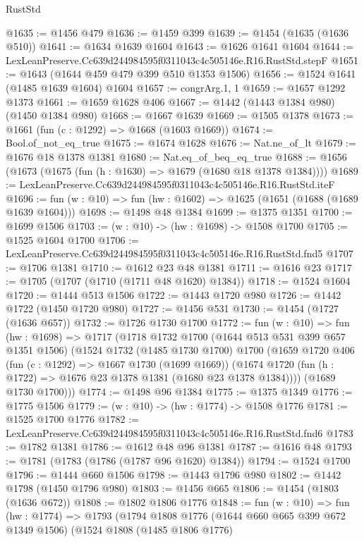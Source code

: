 \begin{lexlean}{RustStd}
\begin{coremodule}
@1635 := @1456 @479
@1636 := @1459 @399
@1639 := @1454 (@1635 (@1636 @510))
@1641 := @1634 @1639 @1604
@1643 := @1626 @1641 @1604
@1644 := LexLeanPreserve.Cc639d244984595f0311043c4c505146e.R16.RustStd.stepF
@1651 := @1643 (@1644 @459 @479 @399 @510 @1353 @1506)
@1656 := @1524 @1641 (@1485 @1639 @1604) @1604
@1657 := congrArg.{1, 1}
@1659 := @1657 @1292 @1373
@1661 := @1659 @1628 @406
@1667 := @1442 (@1443 @1384 @980) (@1450 @1384 @980)
@1668 := @1667 @1639
@1669 := @1505 @1378
@1673 := @1661 (fun (c : @1292) => @1668 (@1603 @1669))
@1674 := Bool.of_not_eq_true
@1675 := @1674 @1628
@1676 := Nat.ne_of_lt
@1679 := @1676 @18 @1378 @1381
@1680 := Nat.eq_of_beq_eq_true
@1688 := @1656 (@1673 (@1675 (fun (h : @1630) => @1679 (@1680 @18 @1378 @1384))))
@1689 := LexLeanPreserve.Cc639d244984595f0311043c4c505146e.R16.RustStd.iteF
@1696 := fun (w : @10) => fun (hw : @1602) => @1625 (@1651 (@1688 (@1689 @1639 @1604)))
@1698 := @1498 @48 @1384
@1699 := @1375 @1351
@1700 := @1699 @1506
@1703 := (w : @10) -> (hw : @1698) -> @1508 @1700
@1705 := @1525 @1604 @1700
@1706 := LexLeanPreserve.Cc639d244984595f0311043c4c505146e.R16.RustStd.fnd5
@1707 := @1706 @1381
@1710 := @1612 @23 @48 @1381
@1711 := @1616 @23
@1717 := @1705 (@1707 (@1710 (@1711 @48 @1620) @1384))
@1718 := @1524 @1604
@1720 := @1444 @513 @1506
@1722 := @1443 @1720 @980
@1726 := @1442 @1722 (@1450 @1720 @980)
@1727 := @1456 @531
@1730 := @1454 (@1727 (@1636 @657))
@1732 := @1726 @1730 @1700
@1772 := fun (w : @10) =>
  fun (hw : @1698) =>
  @1717
    (@1718
      @1732
      @1700
      (@1644 @513 @531 @399 @657 @1351 @1506)
      (@1524
        @1732
        (@1485 @1730 @1700)
        @1700
        (@1659
          @1720
          @406
          (fun (c : @1292) => @1667 @1730 (@1699 @1669))
          (@1674 @1720 (fun (h : @1722) => @1676 @23 @1378 @1381 (@1680 @23 @1378 @1384))))
        (@1689 @1730 @1700)))
@1774 := @1498 @96 @1384
@1775 := @1375 @1349
@1776 := @1775 @1506
@1779 := (w : @10) -> (hw : @1774) -> @1508 @1776
@1781 := @1525 @1700 @1776
@1782 := LexLeanPreserve.Cc639d244984595f0311043c4c505146e.R16.RustStd.fnd6
@1783 := @1782 @1381
@1786 := @1612 @48 @96 @1381
@1787 := @1616 @48
@1793 := @1781 (@1783 (@1786 (@1787 @96 @1620) @1384))
@1794 := @1524 @1700
@1796 := @1444 @660 @1506
@1798 := @1443 @1796 @980
@1802 := @1442 @1798 (@1450 @1796 @980)
@1803 := @1456 @665
@1806 := @1454 (@1803 (@1636 @672))
@1808 := @1802 @1806 @1776
@1848 := fun (w : @10) =>
  fun (hw : @1774) =>
  @1793
    (@1794
      @1808
      @1776
      (@1644 @660 @665 @399 @672 @1349 @1506)
      (@1524
        @1808
        (@1485 @1806 @1776)

\end{coremodule}
\end{lexlean}
